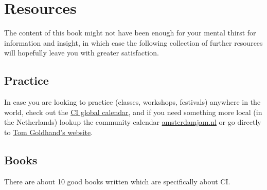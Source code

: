 \section{Resources}\label{sec:resources}

The content of this book might not have been enough for your mental thirst for information and insight, in which case the following collection of further resources will hopefully leave you with greater satisfaction.

\subsection{Practice}\label{subsec:practice}

In case you are looking to practice (classes, workshops, festivals) anywhere in the world, check out the \href{https://ciglobalcalendar.net}{CI global calendar}, and if you need something more local (in the Netherlands) lookup the community calendar \href{https://amsterdamjam.nl}{amsterdamjam.nl} or go directly to \href{https://tomgoldhand.com}{Tom Goldhand's website}.

\subsection{Books}\label{subsec:books}

There are about 10 good books written which are specifically about CI\@.

